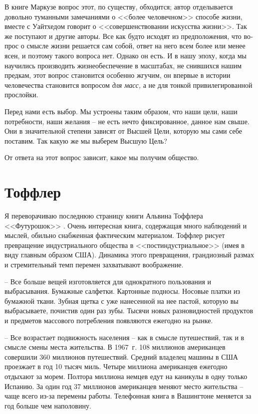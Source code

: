 \documentclass{book}
\begin{document}
В книге Маркузе вопрос этот, по существу, обходится; ав­тор отделывается довольно туманными замечаниями о <<более человечном>> способе жизни, вместе с Уайтхедом говорит о <<со­вершенствовании искусства жизни>>. Так же поступают и другие авторы. Все как будто исходят из предположения, что во­прос о смысле жизни решается сам собой, ответ на него всем более или менее ясен, и поэтому такого вопроса нет. Однако он есть. И в нашу эпоху, когда мы научились производить жизнеобеспечение в масштабах, не снившихся нашим предкам, этот вопрос становится особенно жгучим, он впервые в исто­рии человечества становится вопросом \textit{для масс,}  а не для тонкой привилегированной прослойки.

Перед нами есть выбор. Мы устроены таким образом, что наши цели, наши потребности, наши желания -- не есть нечто фиксированное, данное нам свыше. Они в значительной степе­ни зависят от Высшей Цели, которую мы сами себе поставим. Так какую же мы выберем Высшую Цель?

От ответа на этот вопрос зависит, какое мы получим общество.


\section{Тоффлер}

Я переворачиваю последнюю страницу книги Альвина Тоффлера <<Футурошок>>%
.
Очень интересная книга, содержащая много наблюдений и мыслей, обильно снабженная 
фактическим материалом. Тоффлер рисует превращение индустриального общества в 
<<пост\-ин\-ду\-стри\-аль\-ное>> (имея в виду главным образом США). Динамика этого превращения, 
грандиозный размах и стремительный темп перемен захватывают воображение.

-- Все больше вещей изготовляется для однократного пользования и выбрасывания. Бумажные салфетки. Картонные подносы. Носовые платки из бумажной ткани. Зубная щетка с уже нанесенной на нее пастой, которую вы выбрасываете, почистив один раз зубы. Тысячи новых разновидностей продуктов и предметов массового потребления появляются ежегодно на рынке.

-- Все возрастает подвижность населения -- как в смысле путешествий, так и в смысле смены места жительства. В 1967~г. 108 миллионов американцев совершили 360 миллионов путешествий. Средний владелец машины в США проезжает в год 10 тысяч миль. Четыре миллиона американцев ежегодно отдыхают за морем. Полтора миллиона немцев едут на каникулы в одну только Испанию. За один год 37 миллионов американцев меняют место жительства -- чаще всего из-за перемены работы. Телефонная книга в Вашингтоне меняется за год больше чем наполовину.
\end{document}
